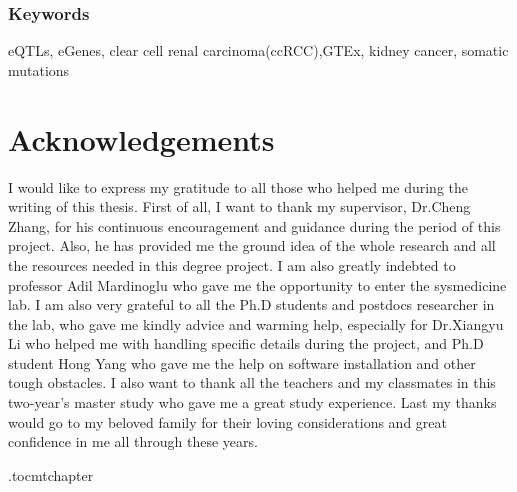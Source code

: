 \subsection*{Keywords}
eQTLs, eGenes, clear cell renal carcinoma(ccRCC),GTEx, kidney cancer, somatic mutations

\newpage
\thispagestyle{plain}
\chapter*{Acknowledgements}

I would like to express my gratitude to all those who helped me during the writing of this thesis. First of all, I want to thank my supervisor, Dr.Cheng Zhang, for his continuous encouragement and guidance during the period of this project. Also, he has provided me the ground idea of the whole research and all the resources needed in this degree project. I am also greatly indebted to professor Adil Mardinoglu who gave me the opportunity to enter the sysmedicine lab. I am also very grateful to all the Ph.D students and postdocs researcher in the lab, who gave me kindly advice and warming help, especially for Dr.Xiangyu Li who helped me with handling specific details during the project, and Ph.D student Hong Yang who gave me the help on software installation and other tough obstacles. I also want to thank all the teachers and my classmates in this two-year's master study who gave me a great study experience. Last my thanks would go to my beloved family for their loving considerations and great confidence in me all through these years.


\newpage

\etocdepthtag.toc{mtchapter}
\thispagestyle{plain}
\tableofcontents

\newpage


